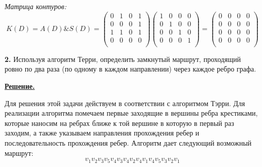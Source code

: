 \documentclass[12pt, letterpaper, titlepage]{article}
\begin{document}
\emph{Матрица контуров:}
\begin{equation*}
    K(D)=A(D) \& S(D) = 
    \begin{pmatrix}
        0 & 1 & 0 & 1\\
        0 & 0 & 0 & 1\\
        1 & 1 & 0 & 1\\
        0 & 0 & 0 & 0\\
    \end{pmatrix}
    \begin{pmatrix}
        1 & 0 & 0 & 0\\
        0 & 1 & 0 & 0\\
        0 & 0 & 1 & 0\\
        0 & 0 & 0 & 1\\
    \end{pmatrix}
    =
    \begin{pmatrix}
        0 & 0 & 0 & 0\\
        0 & 0 & 0 & 0\\
        0 & 0 & 0 & 0\\
        0 & 0 & 0 & 0\\
    \end{pmatrix}
\end{equation*}

\textbf{2.} Используя алгоритм Терри, определить замкнутый маршрут, проходящий ровно по два раза
(по одному в каждом направлении) через каждое ребро графа.

\underline{\textbf{Решение.}}

Для решения этой задачи действуем в соответствии с алгоритмом Тэрри.
Для реализации алгоритма помечаем первые заходящие в вершины ребра крестиками, которые наносим на 
ребрах ближе к той вершине в которую в первый
раз заходим, а также указываем направления прохождения ребер и последовательность
прохождения ребер. Алгоритм дает следующий возможный маршрут:
\begin{equation*}
    v_1v_2v_3v_5v_4v_3v_4v_2v_4v_1v_4v_5v_3v_2v_1
\end{equation*}

\center
\end{document}
